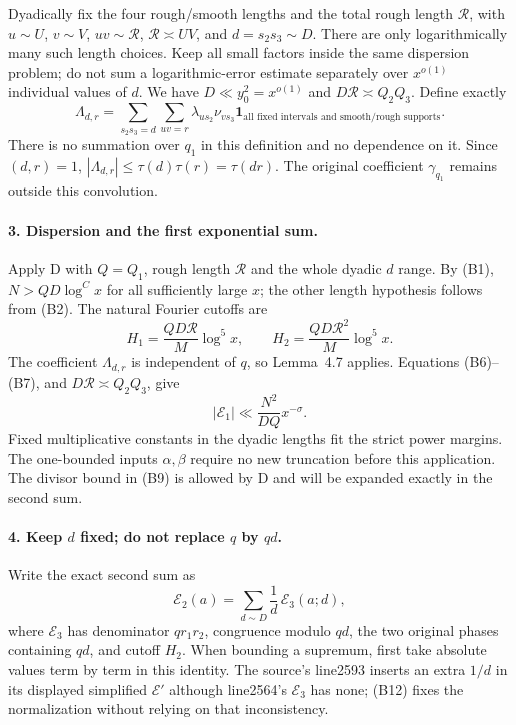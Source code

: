 Dyadically fix the four rough/smooth lengths and the total rough
length $\mathcal R$, with $u\sim U$, $v\sim V$, $uv\sim\mathcal R$,
$\mathcal R\asymp UV$, and $d=s_2s_3\sim D$. There are only
logarithmically many such length choices. Keep all small factors
inside the same dispersion problem; do not sum a logarithmic-error
estimate separately over $x^{o(1)}$ individual values of $d$.
We have $D\ll y_0^2=x^{o(1)}$ and $D\mathcal R\asymp Q_2Q_3$.
Define exactly
\[
 \Lambda_{d,r}=\sum_{s_2s_3=d}
   \sum_{uv=r}\lambda_{us_2}\nu_{vs_3}
       \mathbf1_{\text{all fixed intervals and smooth/rough supports}}.
                                                               \tag{B9}
\]
There is no summation over $q_1$ in this definition and no dependence
on it. Since $(d,r)=1$, $|\Lambda_{d,r}|\le\tau(d)\tau(r)=\tau(dr)$.
The original coefficient $\gamma_{q_1}$ remains outside this convolution.

\paragraph{3. Dispersion and the first exponential sum.}
Apply D with $Q=Q_1$, rough length $\mathcal R$ and the whole dyadic
$d$ range. By (B1), $N>QD\log^Cx$ for all sufficiently large $x$;
the other length hypothesis follows from (B2). The natural Fourier
cutoffs are
\[
 H_1=\frac{QD\mathcal R}{M}\log^5x,
 \qquad H_2=\frac{QD\mathcal R^2}{M}\log^5x.                 \tag{B10}
\]
The coefficient $\Lambda_{d,r}$ is independent of $q$, so Lemma~4.7
applies. Equations (B6)--(B7), and $D\mathcal R\asymp Q_2Q_3$,
give
\[
 |\mathcal E_1|\ll \frac{N^2}{DQ}x^{-\sigma}.              \tag{B11}
\]
Fixed multiplicative constants in the dyadic lengths fit the strict
power margins. The one-bounded inputs $\alpha,\beta$ require no
new truncation before this application. The divisor bound in (B9)
is allowed by D and will be expanded exactly in the second sum.

\paragraph{4. Keep $d$ fixed; do not replace $q$ by $qd$.}
Write the exact second sum as
\[
 \mathcal E_2(a)=\sum_{d\sim D}\frac1d\,\mathcal E_3(a;d), \tag{B12}
\]
where $\mathcal E_3$ has denominator $qr_1r_2$, congruence modulo
$qd$, the two original phases containing $qd$, and cutoff $H_2$.
When bounding a supremum, first take absolute values term by term
in this identity. The source's line2593 inserts an extra $1/d$
in its displayed simplified $\mathcal E'$ although line2564's
$\mathcal E_3$ has none; (B12) fixes the normalization without
relying on that inconsistency.

